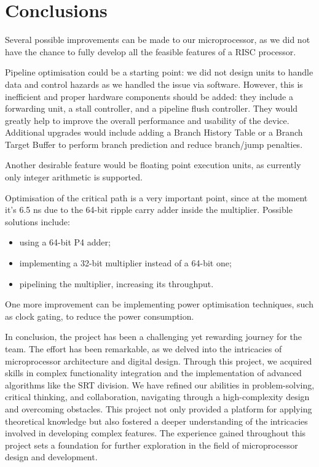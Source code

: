 \chapter{Conclusions}\label{Conclusions}

Several possible improvements can be made to our microprocessor, as we did not have the chance to fully develop all the feasible features of a RISC processor. 

Pipeline optimisation could be a starting point: we did not design units to handle data and control hazards  as we handled the issue via software. 
However, this is inefficient and proper hardware components should be added: they include a forwarding unit, a stall controller, and a pipeline flush controller.
They would greatly help to improve the overall performance and usability of the device. 
Additional upgrades would include adding a Branch History Table or a Branch Target Buffer to perform branch prediction and reduce branch/jump penalties.

Another desirable feature would be floating point execution units, as currently only integer arithmetic is supported.

Optimisation of the critical path is a very important point, since at the moment it's 6.5 \si{\nano\second} due to the 64-bit ripple carry adder inside the multiplier. 
Possible solutions include: 
\begin{itemize}
    \item using a 64-bit P4 adder;
    \item implementing a 32-bit multiplier instead of a 64-bit one;
    \item pipelining the multiplier, increasing its throughput.
\end{itemize}

One more improvement can be implementing power optimisation techniques, such as clock gating, to reduce the power consumption.

In conclusion, the project has been a challenging yet rewarding journey for the team. 
The effort has been remarkable, as we delved into the intricacies of microprocessor architecture and digital design. 
Through this project, we acquired skills in complex functionality integration and the implementation of advanced algorithms like the SRT division.
We have refined our abilities in problem-solving, critical thinking, and collaboration, navigating through a high-complexity design and overcoming obstacles. 
This project not only provided a platform for applying theoretical knowledge but also fostered a deeper understanding of the intricacies involved in developing complex features. 
The experience gained throughout this project sets a foundation for further exploration in the field of microprocessor design and development.





